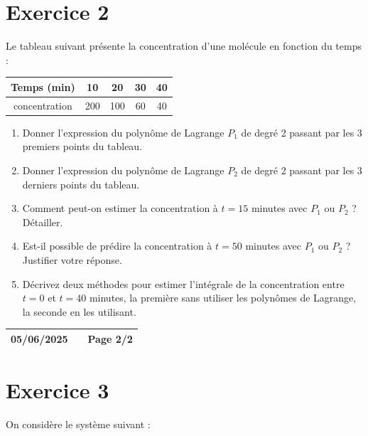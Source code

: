 \documentclass[10pt]{article}
\begin{document}
\section*{Exercice 2}
Le tableau suivant présente la concentration d'une molécule en fonction du temps :
\begin{center}
    \begin{tabular}{|c|c|c|c|c|}
\hline Temps (min) & 10 & 20 & 30 & 40 \\
\hline concentration & 200 & 100 & 60 & 40 \\
\hline
\end{tabular}
\end{center}
\begin{enumerate}
    \item Donner l'expression du polynôme de Lagrange $P_1$ de degré 2 passant par les 3 premiers points du tableau.
    \item Donner l'expression du polynôme de Lagrange $P_2$ de degré 2 passant par les 3 derniers points du tableau.
    \item Comment peut-on estimer la concentration à $t=15$ minutes avec $P_1$ ou $P_2$ ? Détailler. 
    \item Est-il possible de prédire la concentration à $t=50$ minutes  avec $P_1$ ou $P_2$ ? Justifier votre réponse.
    \item Décrivez deux méthodes pour estimer l'intégrale de la concentration entre $t=0$ et $t=40$ minutes, \newline 
    la première sans utiliser les polynômes de Lagrange, la seconde en les utilisant.
\end{enumerate}


\newpage

\begin{center}
    \renewcommand{\arraystretch}{1.5} 
    \begin{tabular}{|>{\centering\arraybackslash}m{4cm}|>{\centering\arraybackslash}m{6cm}|>{\centering\arraybackslash}m{4cm}|}
        \hline
        \textbf{05/06/2025} &\hspace{6cm} & \textbf{Page 2/2}\\
            \hline
    \end{tabular}
\end{center}
\vspace{1em}
\section*{Exercice 3}
On considère le système suivant :
\end{document}
